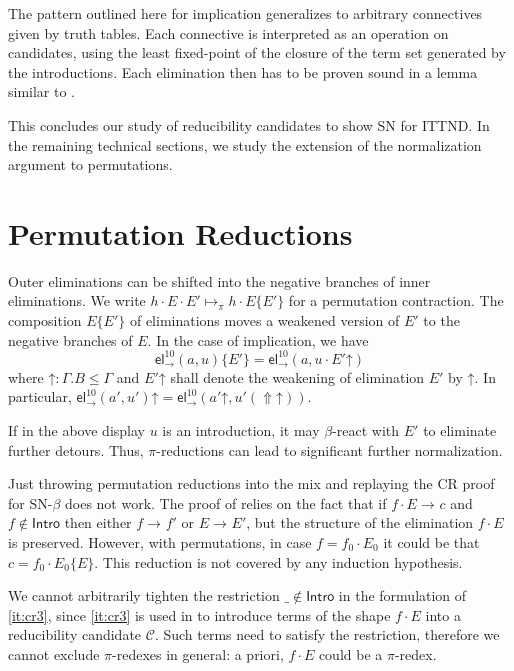 \documentclass[a4paper,USenglish,cleveref, autoref, thm-restate]{lipics-v2019}
\newcommand{\tel}{\mathsf{el}}
\newcommand{\el}[2]{\ensuremath{\tel_{#1}^{#2}}}
\newcommand{\contract}[1][]{\mapsto_{#1}}
\newcommand{\red}[1][]{\longrightarrow_{#1}}
\newcommand{\C}{\mathcal{C}}
\newcommand{\Intro}{\mathsf{Intro}}
\newcommand{\Up}{\mathop{\Uparrow}}
\newcommand{\up}{\mathord{\uparrow}}
\begin{document}
The pattern outlined here for implication generalizes to arbitrary
connectives given by truth tables.  Each connective is interpreted as
an operation on candidates, using the least fixed-point of the closure
of the term set generated by the introductions.  Each elimination then
has to be proven sound in a lemma similar to .

This concludes our study of reducibility candidates to show SN for ITTND.
In the remaining technical
sections, we study the extension of the normalization argument to
permutations.

\section{Permutation Reductions}
\label{sec:perm}

Outer eliminations can be shifted into the negative branches of inner
eliminations.  We write
$h \cdot E \cdot E' \contract[\pi] h \cdot E\{E'\}$ for a permutation
contraction.  The composition $E\{E'\}$ of eliminations moves a weakened
version of $E'$ to the negative branches of $E$.  In the case of
implication, we have
\[
  \el\to{10}(a,u) \{ E' \} = \el\to{10}(a,u \cdot E' \up)
\]
where $\up : \Gamma.B \leq \Gamma$ and
$E' \up$ shall denote the weakening of elimination $E'$ by $\up$.
In particular, $\el\to{10}(a',u') \up = \el\to{10}(a' \up, u' (\Up\up))$.

If in the above display $u$ is an introduction, it may $\beta$-react with $E'$
to eliminate further detours.  Thus, $\pi$-reductions can lead to
significant further normalization.

Just throwing permutation reductions into the mix and replaying the CR
proof for SN-$\beta$ does not work.  The proof of  relies
on the fact that if $f \cdot E \red c$ and $f \not\in \Intro$ then
either $f \red f'$ or $E \red E'$, but the structure of the
elimination $f \cdot E$ is preserved.  However, with permutations, in
case $f = f_0 \cdot E_0$ it could be that $c = f_0 \cdot E_0\{E\}$.
This reduction is not covered by any induction hypothesis.

We cannot arbitrarily tighten the restriction $\_ \not\in \Intro$ in
the formulation of \ref{it:cr3}, since \ref{it:cr3} is used in  to
introduce terms of the shape $f \cdot E$
into a reducibility candidate $\C$.  Such terms need to satisfy the
restriction, therefore we cannot exclude $\pi$-redexes in general: a
priori, $f \cdot E$ could be a $\pi$-redex.
\end{document}
